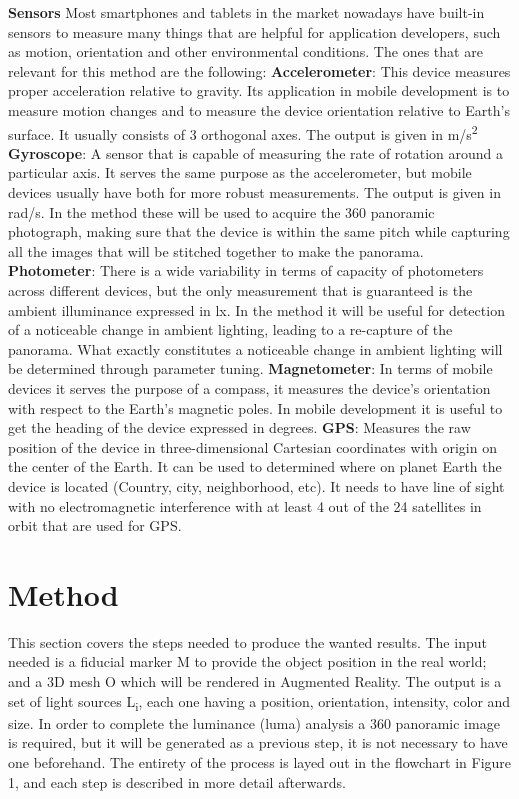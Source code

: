 \documentclass{article}
\begin{document}
\textbf{Sensors}\newline
Most smartphones and tablets in the market nowadays have built-in sensors to measure many things that are helpful for application developers, such as motion, orientation and other environmental conditions. The ones that are relevant for this method are the following:\newline
\textbf{Accelerometer}: This device measures proper acceleration relative to gravity. Its application in mobile development is to measure motion changes and to measure the device orientation relative to Earth's surface. It usually consists of 3 orthogonal axes. The output is given in m/s\textsuperscript{2} \newline
\textbf{Gyroscope}: A sensor that is capable of measuring the rate of rotation around a particular axis. It serves the same purpose as the accelerometer, but mobile devices usually have both for more robust measurements. The output is given in rad/s. In the method these will be used to acquire the 360 panoramic photograph, making sure that the device is within the same pitch while capturing all the images that will be stitched together to make the panorama. \newline
\textbf{Photometer}: There is a wide variability in terms of capacity of photometers across different devices, but the only measurement that is guaranteed is the ambient illuminance expressed in lx.  In the method it will be useful for detection of a noticeable change in ambient lighting, leading to a re-capture of the panorama. What exactly constitutes a noticeable change in ambient lighting will be determined through parameter tuning. \newline 
\textbf{Magnetometer}: In terms of mobile devices it serves the purpose of a compass, it measures the device's orientation with respect to the Earth's magnetic poles. In mobile development it is useful to get the heading of the device expressed in degrees.\newline
\textbf{GPS}: Measures the raw position of the device in three-dimensional Cartesian coordinates with origin on the center of the Earth. It can be used to determined where on planet Earth the device is located (Country, city, neighborhood, etc). It needs to have line of sight with no electromagnetic interference with at least 4 out of the 24 satellites in orbit that are used for GPS. \newline

\section{Method}
This section covers the steps needed to produce the wanted results. The input needed is a fiducial marker M to provide the object position in the real world; and a 3D mesh O which will be rendered in Augmented Reality. The output is a set of light sources L\textsubscript{i}, each one having a position, orientation, intensity, color and size. In order to complete the luminance (luma) analysis a 360 panoramic image is required, but it will be generated as a previous step, it is not necessary to have one beforehand. The entirety of the process is layed out in the flowchart in Figure 1, and each step is described in more detail afterwards.
\end{document}

